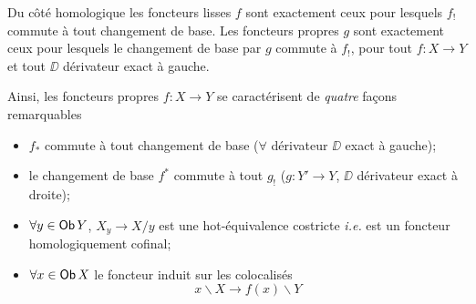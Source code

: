 \noindent Du côté homologique les foncteurs lisses $f$ sont exactement ceux pour lesquels $f_!$ commute à tout changement de base. Les foncteurs propres $g$ sont exactement ceux pour lesquels le changement de base par $g$ commute à $f_!$, pour tout $f : X \to Y$ et tout $\DD$ dérivateur exact à gauche.

\noindent{}
Ainsi, les foncteurs propres $f : X \to Y$ se caractérisent de \textit{quatre} façons remarquables
\begin{itemize}[label={}, leftmargin=0pt, itemindent=2\parindent, labelsep=0.3em]
\item[\textit{a})] $f_*$ commute à tout changement de base ($\forall$ dérivateur $\DD$ exact à gauche);
\item[\textit{b})] le changement de base $f^*$ commute à tout $g_!$ ($g : Y' \to Y$, $\DD$ dérivateur exact à droite);
\item[\textit{c})] $\forall y \in \mathsf{Ob}\, Y$, $X_y \to X/y$ est une hot-équivalence costricte \textit{i.e.} est un foncteur homologiquement cofinal;
\item[\textit{d})] $\forall x \in \mathsf{Ob}\, X$ le foncteur induit sur les colocalisés
\[
x\backslash X \longrightarrow f(x)\backslash Y
\]
\end{itemize}

